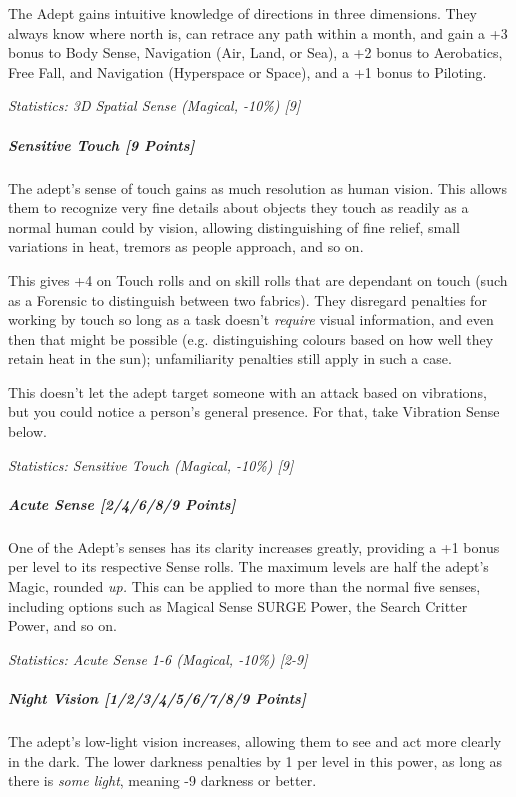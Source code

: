 \begin{multicols}{3}
		The Adept gains intuitive knowledge of directions in three dimensions. They always know where north is, can retrace any path within a month, and gain a +3 bonus to Body Sense, Navigation (Air, Land, or Sea), a +2 bonus to Aerobatics, Free Fall, and Navigation (Hyperspace or Space), and a +1 bonus to Piloting.
		
		\textcolor{OliveGreen}{\textit{Statistics: 3D Spatial Sense (Magical, -10\%) [9]}}
			
	\subparagraph{Sensitive Touch [9 Points]}
	
		The adept's sense of touch gains as much resolution as human vision. This allows them to recognize very fine details about objects they touch as readily as a normal human could by vision, allowing distinguishing of fine relief, small variations in heat, tremors as people approach, and so on. 
		
		This gives +4 on Touch rolls and on skill rolls that are dependant on touch (such as a Forensic to distinguish between two fabrics). They disregard penalties for working by touch so long as a task doesn't \textit{require} visual information, and even then that might be possible (e.g. distinguishing colours based on how well they retain heat in the sun); unfamiliarity penalties still apply in such a case. 
		
		This doesn't let the adept target someone with an attack based on vibrations, but you could notice a person's general presence. For that, take Vibration Sense below.
			
		\textcolor{OliveGreen}{\textit{Statistics: Sensitive Touch (Magical, -10\%) [9] }}
			
	\subparagraph{Acute Sense [2/4/6/8/9 Points]}
	
		One of the Adept's senses has its clarity increases greatly, providing a +1 bonus per level to its respective Sense rolls. The maximum levels are half the adept's Magic, rounded \textit{up.} This can be applied to more than the normal five senses, including options such as Magical Sense SURGE Power, the Search Critter Power, and so on.
		
		\textcolor{OliveGreen}{\textit{Statistics: Acute Sense 1-6 (Magical, -10\%) [2-9]}}
				
	\subparagraph{Night Vision [1/2/3/4/5/6/7/8/9 Points]}
	
		The adept's low-light vision increases, allowing them to see and act more clearly in the dark. The lower darkness penalties by 1 per level in this power, as long as there is \textit{some light}, meaning -9 darkness or better.
		

\end{multicols}
